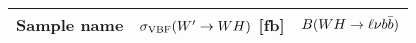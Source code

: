 \footnotesize
\begin{tabular}{lrr}
  \hline
  \textbf{Sample name} & $\sigma_{\mathrm{VBF}}(W'\to WH)$ [fb] & $B(WH\to\ell\nu b\bar{b})$ \\
  \hline
\end{tabular}
